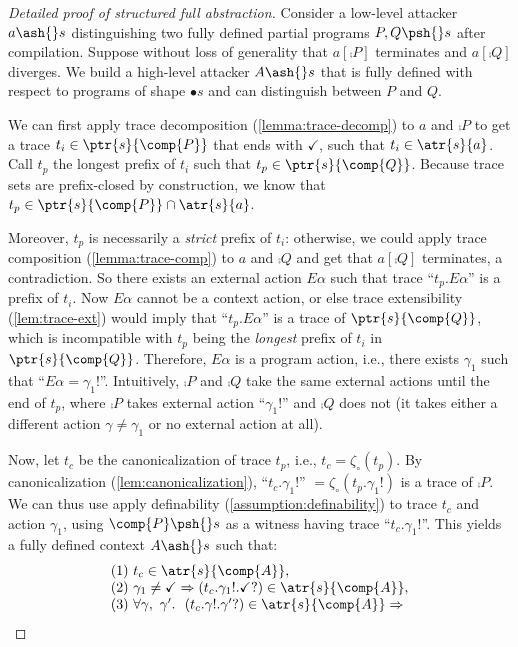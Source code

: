 \documentclass[10pt, conference, compsocconf, letterpaper, times]{IEEEtran}
\begin{document}
\begin{proof}[Detailed proof of structured full abstraction]
Consider a low-level attacker $a \ash{}s$ distinguishing
two fully defined partial programs  $P,Q \psh{}s$ after compilation.
Suppose without loss of generality that $a[\comp{P}]$ terminates and $a[\comp{Q}]$
diverges.
We build a high-level attacker $A \ash{}s$ that is fully defined
with respect to programs of shape $\bullet s$ and can distinguish between
$P$ and $Q$.

We can first apply trace decomposition (\autoref{lemma:trace-decomp})
to $a$ and $\comp{P}$ to get a trace $t_i \in \ptr{s}{\comp{P}}$ that ends
with $\checkmark$, such that $t_i \in \atr{s}{a}$.
Call $t_p$ the longest prefix of $t_i$ such that
$t_p \in \ptr{s}{\comp{Q}}$.
Because trace sets are prefix-closed by construction, we know that
$t_p \in \ptr{s}{\comp{P}} \cap \atr{s}{a}$.

Moreover, $t_p$ is necessarily a \emph{strict} prefix of $t_i$:
otherwise, we could apply trace composition
(\autoref{lemma:trace-comp})
\iffull to $a$ and $\comp{Q}$ \fi
and get that $a[\comp{Q}]$ terminates, a contradiction.
So there exists an
external action $E\alpha$ such that trace ``$t_p.E\alpha$'' is a
prefix of $t_i$.
Now $E\alpha$ cannot be a context action,
or else trace extensibility (\autoref{lem:trace-ext}) would imply that
``$t_p.E\alpha$'' is a trace of $\ptr{s}{\comp{Q}}$, which is incompatible
with $t_p$ being the \emph{longest} prefix of $t_i$ in
$\ptr{s}{\comp{Q}}$.
Therefore, $E\alpha$ is a program action, i.e., there
exists $\gamma_1$ such that ``$E\alpha = \gamma_1!$''.
Intuitively, $\comp{P}$ and $\comp{Q}$ take the same external actions
until the end of $t_p$, where $\comp{P}$ takes external action
``$\gamma_1!$'' and $\comp{Q}$ does not (it takes either a different
action $\gamma \neq \gamma_1$ or no external action at all).

Now, let $t_c$ be the canonicalization of trace $t_p$, i.e.,
$t_c = \zeta_{\circ}(t_p)$.
By canonicalization (\autoref{lem:canonicalization}),
``$t_c.\gamma_1!$'' $= \zeta_{\circ}(t_p.\gamma_1!)$ is a trace of $\comp{P}$.
We can thus use apply definability (\autoref{assumption:definability})
to trace $t_c$ and action $\gamma_1$, using $\comp{P} \psh{}s$ as a
witness having trace ``$t_c.\gamma_1!$''.
This yields a {fully defined} context $A \ash{}s$ such that:
\[
\begin{array}{l}
  \text{(1) }t_c \in \atr{s}{\comp{A}}, \\
  \text{(2) }\gamma_1 \neq \checkmark \Rightarrow
  (t_c.\gamma_1!.\checkmark?) \in \atr{s}{\comp{A}}, \\
  \text{(3) }\forall \gamma,~ \gamma'.~~(t_c.\gamma!.\gamma'?) \in \atr{s}{\comp{A}} \Rightarrow


\end{array}\]
\end{proof}
\end{document}
